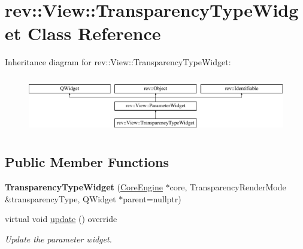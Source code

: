 \hypertarget{classrev_1_1_view_1_1_transparency_type_widget}{}\section{rev\+::View\+::Transparency\+Type\+Widget Class Reference}
\label{classrev_1_1_view_1_1_transparency_type_widget}
Inheritance diagram for rev\+::View\+::Transparency\+Type\+Widget\+:\begin{figure}[H]
\begin{center}
\leavevmode
\includegraphics[height=2.500000cm]{classrev_1_1_view_1_1_transparency_type_widget}
\end{center}
\end{figure}
\subsection*{Public Member Functions}
\begin{DoxyCompactItemize}
\item 
\mbox{\label{classrev_1_1_view_1_1_transparency_type_widget_afe84f9c27db3c91c1a750d95acc2f2a5}} 
{\bfseries Transparency\+Type\+Widget} (\mbox{\hyperlink{classrev_1_1_core_engine}{Core\+Engine}} $\ast$core, Transparency\+Render\+Mode \&transparency\+Type, Q\+Widget $\ast$parent=nullptr)
\item 
\mbox{\label{classrev_1_1_view_1_1_transparency_type_widget_ae37c4373471593b4b2d2c91d00706575}} 
virtual void \mbox{\hyperlink{classrev_1_1_view_1_1_transparency_type_widget_ae37c4373471593b4b2d2c91d00706575}{update}} () override
\begin{DoxyCompactList}\small\item\em Update the parameter widget. \end{DoxyCompactList}\end{DoxyCompactItemize}
